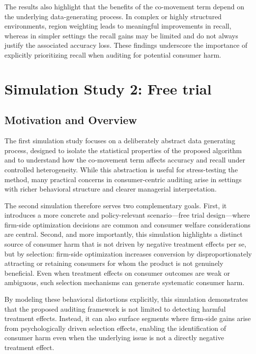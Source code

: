 \documentclass[11pt,letterpaper,english]{article}
\theoremstyle{definition}
\theoremstyle{definition}
\begin{document}
\begin{bibunit}
The results also highlight that the benefits of the co-movement term depend on the underlying data-generating process. In complex or highly structured environments, region weighting leads to meaningful improvements in recall, whereas in simpler settings the recall gains may be limited and do not always justify the associated accuracy loss. These findings underscore the importance of explicitly prioritizing recall when auditing for potential consumer harm.




\section{Simulation Study 2: Free trial}
\label{sec:simulation1}
\subsection{Motivation and Overview}

The first simulation study focuses on a deliberately abstract data generating process, designed to isolate the statistical properties of the proposed algorithm and to understand how the co-movement term affects accuracy and recall under controlled heterogeneity. While this abstraction is useful for stress-testing the method, many practical concerns in consumer-centric auditing arise in settings with richer behavioral structure and clearer managerial interpretation.

The second simulation therefore serves two complementary goals. First, it introduces a more concrete and policy-relevant scenario—free trial design—where firm-side optimization decisions are common and consumer welfare considerations are central. Second, and more importantly, this simulation highlights a distinct source of consumer harm that is not driven by negative treatment effects per se, but by selection: firm-side optimization increases conversion by disproportionately attracting or retaining consumers for whom the product is not genuinely beneficial. Even when treatment effects on consumer outcomes are weak or ambiguous, such selection mechanisms can generate systematic consumer harm.

By modeling these behavioral distortions explicitly, this simulation demonstrates that the proposed auditing framework is not limited to detecting harmful treatment effects. Instead, it can also surface segments where firm-side gains arise from psychologically driven selection effects, enabling the identification of consumer harm even when the underlying issue is not a directly negative treatment effect.


\end{bibunit}
\end{document}
